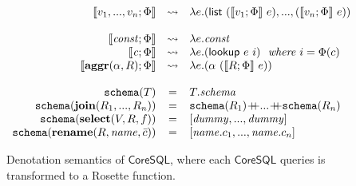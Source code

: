 \begin{figure}[ht]
\[\begin{array}{rcl}
\\
 \llbracket v_1,...,v_n;\Phi \rrbracket & \leadsto &\lambda e. (\mathsf{list}~(\llbracket v_1;\Phi\rrbracket~e),...,(\llbracket v_n;\Phi\rrbracket~e)) \\
 \\
\llbracket \mathit{const};\Phi \rrbracket & \leadsto & \lambda e.\mathit{const}\\
\llbracket \mathit{c};\Phi \rrbracket & \leadsto & \lambda e. (\mathsf{lookup}~e~i)~~\textit{where $i=\Phi(c)$}\\
\llbracket \mathbf{aggr}(\alpha, R);\Phi \rrbracket & \leadsto & \lambda e.(\alpha~(\llbracket R;\Phi\rrbracket~e))\\
\\
\mathtt{schema}(T) & = & T.\mathit{schema}\\
\mathtt{schema}(\mathbf{join}(R_1,...,R_n)) & = & \mathtt{schema}( R_1) \concat ...\concat \mathtt{schema}(R_n)\\
\mathtt{schema}(\mathbf{select}(V, R, f))&=& [\mathit{dummy},...,\mathit{dummy}]\\
\mathtt{schema}(\mathbf{rename}(R, \mathit{name}, \bar{c})) &=& [\mathit{name}.c_1,...,\mathit{name}.c_n]\\
\end{array}
\]
\caption{Denotation semantics of $\mathsf{CoreSQL}$, where each $\mathsf{CoreSQL}$ queries is transformed to a Rosette function.}
\label{fig:denotation}
\end{figure}
